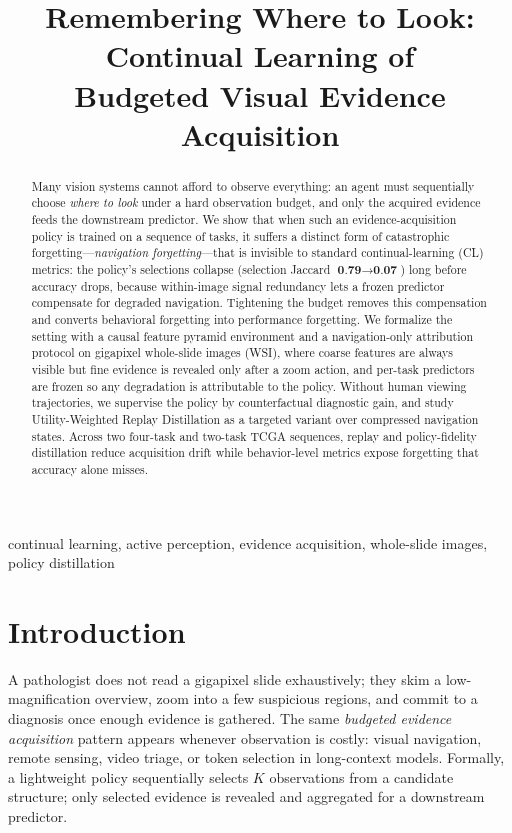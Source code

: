 \documentclass{article}
\title{Remembering Where to Look: Continual Learning of\\ Budgeted Visual Evidence Acquisition}
\newcommand{\xx}[1]{\textbf{#1}}          %
\begin{document}
\maketitle

\begin{abstract}
Many vision systems cannot afford to observe everything: an agent must
sequentially choose \emph{where to look} under a hard observation budget, and
only the acquired evidence feeds the downstream predictor. We show that when
such an evidence-acquisition policy is trained on a sequence of tasks, it
suffers a distinct form of catastrophic forgetting---\emph{navigation
forgetting}---that is invisible to standard continual-learning (CL) metrics:
the policy's selections collapse (selection Jaccard
$\xx{0.79}\!\rightarrow\!\xx{0.07}$) long before accuracy drops, because
within-image signal redundancy lets a frozen predictor compensate for degraded
navigation. Tightening the budget removes this compensation and converts
behavioral forgetting into performance forgetting. We formalize the setting
with a causal feature pyramid environment and a navigation-only attribution
protocol on gigapixel whole-slide images (WSI), where coarse features are
always visible but fine evidence is revealed only after a zoom action, and
per-task predictors are frozen so any degradation is attributable to the
policy. Without human viewing trajectories, we supervise the policy by
counterfactual diagnostic gain, and study Utility-Weighted Replay Distillation
as a targeted variant over compressed navigation states. Across two
four-task and two-task TCGA sequences, replay and policy-fidelity distillation
reduce acquisition drift while behavior-level metrics expose forgetting that
accuracy alone misses.
\end{abstract}

\begin{keywords}
continual learning, active perception, evidence acquisition, whole-slide
images, policy distillation
\end{keywords}

\section{Introduction}
\label{sec:intro}

A pathologist does not read a gigapixel slide exhaustively; they skim a
low-magnification overview, zoom into a few suspicious regions, and commit to
a diagnosis once enough evidence is gathered. The same
\emph{budgeted evidence acquisition} pattern appears whenever observation is
costly: visual navigation, remote sensing, video triage, or token selection in
long-context models. Formally, a lightweight policy sequentially selects $K$
observations from a candidate structure; only selected evidence is revealed
and aggregated for a downstream predictor.
\end{document}
